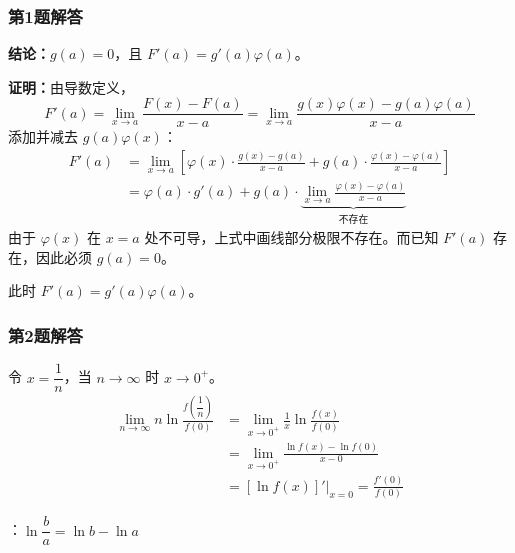 \documentclass[./book.tex]{subfiles}
\begin{document}
    \subsubsection*{第1题解答}
    \begin{analysisbox}
        \textbf{结论：}$g(a) = 0$，且 $F'(a) = g'(a)\varphi(a)$。

        \medskip

        \textbf{证明：}由导数定义，
        \[
            F'(a) = \lim_{x\to a} \frac{F(x) - F(a)}{x - a}
            = \lim_{x\to a} \frac{g(x)\varphi(x) - g(a)\varphi(a)}{x - a}
        \]
        添加并减去 $g(a)\varphi(x)$：
        \[
            \begin{aligned}
                F'(a)
                &= \lim_{x\to a} \left[ \varphi(x) \cdot \frac{g(x) - g(a)}{x - a} + g(a) \cdot \frac{\varphi(x) - \varphi(a)}{x - a} \right] \\[0.5em]
                &= \varphi(a) \cdot g'(a) + g(a) \cdot \underbrace{\lim_{x\to a} \frac{\varphi(x) - \varphi(a)}{x - a}}_{\text{不存在}}
            \end{aligned}
        \]
        由于 $\varphi(x)$ 在 $x=a$ 处不可导，上式中画线部分极限不存在。而已知 $F'(a)$ 存在，因此必须 $g(a) = 0$。

        \medskip

        此时 $F'(a) = g'(a)\varphi(a)$。
    \end{analysisbox}

    \subsubsection*{第2题解答}
    \begin{analysisbox}[解]
        令 $x = \dfrac{1}{n}$，当 $n \to \infty$ 时 $x \to 0^+$。
        \[
            \begin{aligned}
                \lim_{n\to\infty} n\ln\frac{f\!\left(\dfrac{1}{n}\right)}{f(0)}
                &= \lim_{x\to 0^+} \frac{1}{x} \ln\frac{f(x)}{f(0)} \\[0.5em]
                &= \lim_{x\to 0^+} \frac{\ln f(x) - \ln f(0)}{x - 0} \\[0.5em]
                &= \left.[\ln f(x)]'\right|_{x=0} = \frac{f'(0)}{f(0)}
            \end{aligned}
        \]

            {\color{red}{注}}：$\ln \dfrac{b}{a} = \ln b - \ln a$
    \end{analysisbox}
\end{document}
